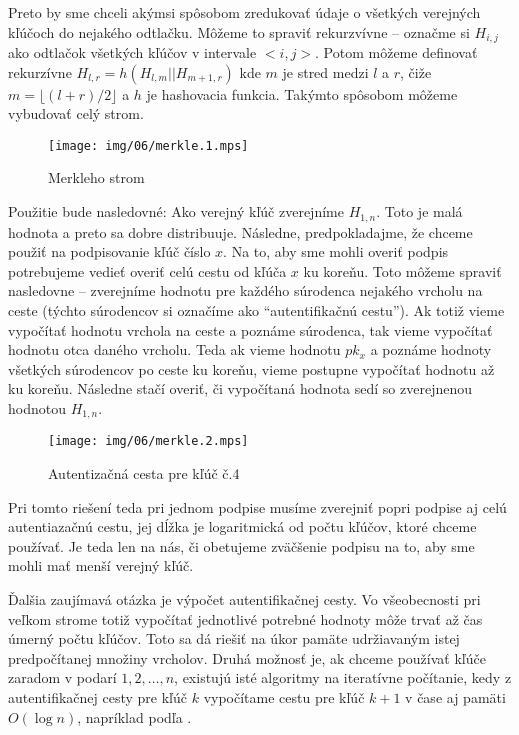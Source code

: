 Preto by sme chceli akýmsi spôsobom zredukovať údaje o všetkých
verejných kľúčoch do nejakého odtlačku. Môžeme to spraviť rekurzvívne
-- označme si $H_{i,j}$ ako odtlačok všetkých kľúčov v intervale $<i,j>$.
Potom môžeme definovať rekurzívne $H_{l,r}=h(H_{l,m} || H_{m+1,r})$ kde
$m$ je stred medzi $l$ a $r$, čiže $m=\lfloor (l+r)/2 \rfloor$ a
$h$ je hashovacia funkcia. Takýmto spôsobom môžeme vybudovať celý
strom.
\begin{figure}[h]
    \centering
    \texttt{[image: img/06/merkle.1.mps]}
    \caption{Merkleho strom}
    \label{fig:merkle}
\end{figure}

Použitie bude nasledovné: Ako verejný kľúč zverejníme $H_{1,n}$. Toto je
malá hodnota a preto sa dobre distribuuje. Následne, predpokladajme, že
chceme použiť na podpisovanie kľúč číslo $x$. Na to, aby sme mohli overiť
podpis potrebujeme vedieť overiť celú cestu od kľúča $x$ ku koreňu. Toto
môžeme spraviť nasledovne -- zverejníme hodnotu pre každého súrodenca
nejakého vrcholu na ceste (týchto súrodencov si označíme ako
``autentifikačnú cestu'').
Ak totiž vieme vypočítať hodnotu vrchola na ceste a poznáme
súrodenca, tak vieme vypočítať hodnotu otca daného vrcholu.
Teda ak vieme hodnotu $pk_x$ a poznáme hodnoty všetkých súrodencov po ceste ku
koreňu, vieme postupne vypočítať hodnotu až ku koreňu. Následne stačí
overiť, či vypočítaná hodnota sedí so zverejnenou hodnotou $H_{1,n}$.

\begin{figure}[h]
    \centering
    \texttt{[image: img/06/merkle.2.mps]}
    \caption{Autentizačná cesta pre kľúč č.4}
    \label{fig:merkle}
\end{figure}

Pri tomto riešení teda pri jednom podpise musíme zverejniť popri podpise aj
celú autentiazačnú cestu, jej dĺžka je logaritmická od počtu kľúčov, ktoré
chceme používať. Je teda len na nás, či obetujeme zväčšenie podpisu na to,
aby sme mohli mať menší verejný kľúč.

Ďalšia zaujímavá otázka je výpočet autentifikačnej cesty. Vo všeobecnosti
pri veľkom strome totiž vypočítať jednotlivé potrebné hodnoty môže trvať až
čas úmerný počtu kľúčov. Toto sa dá riešiť na úkor pamäte udržiavaným istej
predpočítanej množiny vrcholov. Druhá možnosť je, ak chceme používať kľúče
zaradom v podarí $1,2,\dots,n$, existujú isté algoritmy na iteratívne
počítanie, kedy z autentifikačnej cesty pre kľúč $k$ vypočítame cestu pre
kľúč $k+1$ v čase aj pamäti $O(\log n)$, napríklad podľa \cite{merkle_iter}.

